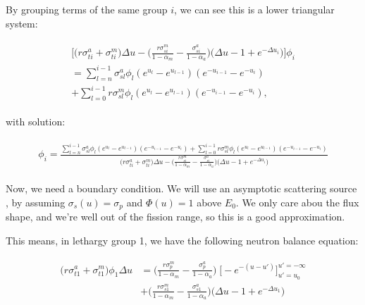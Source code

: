 \documentclass{article}
\begin{document}
        By grouping terms of the same group $i$, we can see this is a lower triangular system:

        \begin{align}
        \begin{split}
            \label{eq:ltri}
            \bigg[ 
                \bigg( r \sigma_{ti}^a + \sigma_{ti}^m  \bigg) \Delta u  - 
                \bigg( \frac{r \sigma_{si}^m }{1-\alpha_m} - \frac{\sigma_{si}^a }{1-\alpha_a}  \bigg)
                \bigg( \Delta u -1 + e^{-\Delta u_i} \bigg) 
            \bigg] \phi_i \\ =
              \sum_{l = n}^{i-1} \sigma_{sl}^a \phi_l  (e^{u_l} - e^{u_{l-1}})   (e^{-u_{i-1}} - e^{-u_{i}}) \\ 
            + \sum_{l = 0}^{i-1} r \sigma_{sl}^m \phi_l  (e^{u_l} - e^{u_{l-1}}) (e^{-u_{i-1}} - e^{-u_{i}}),
        \end{split}
        \end{align}

        with solution:
        
        \begin{align}
        \begin{split}
            \label{eq:soln}
            \phi_i =
            \frac{
                \sum_{l = n}^{i-1} \sigma_{sl}^a \phi_l  (e^{u_l} - e^{u_{l-1}})   (e^{-u_{i-1}} - e^{-u_{i}}) 
                + \sum_{l = 0}^{i-1} r \sigma_{sl}^m \phi_l  (e^{u_l} - e^{u_{l-1}}) (e^{-u_{i-1}} - e^{-u_{i}})
            }
            {  
                \bigg( r \sigma_{ti}^a + \sigma_{ti}^m  \bigg) \Delta u  - 
                \bigg( \frac{r \sigma_{si}^m }{1-\alpha_m} - \frac{\sigma_{si}^a }{1-\alpha_a}  \bigg)
                \bigg( \Delta u -1 + e^{-\Delta u_i} \bigg) 
             }
        \end{split}
        \end{align}

        Now, we need a boundary condition. 
        We will use an asymptotic scattering source , by assuming $\sigma_s(u) = \sigma_p$ and 
        $\Phi(u) = 1$ above $E_0$. 
        We only care abou the flux shape, and we're well out of the fission range, so this is a good approximation.
        
        This means, in lethargy group 1, we have the following neutron balance equation:
        
        \begin{align}
        \begin{split}
            \label{eq:balance_group-1}
            \big( r \sigma_{t1}^a + \sigma_{t1}^m  \big) \phi_1 \Delta u &=
            \bigg( \frac{r \sigma_{p}^m }{1-\alpha_m} - \frac{\sigma_{p}^a }{1-\alpha_a} \bigg)
            \; \bigg[ -e^{-(u-u')} \bigg]_{u' = u_0}^{u'= - \infty}
               \\ &+ 
            \bigg( \frac{r \sigma_{s1}^m }{1-\alpha_m} - \frac{\sigma_{s1}^a }{1-\alpha_a}  \bigg)
            \bigg( \Delta u -1 + e^{-\Delta u_1} \bigg) 
        \end{split}
        \end{align}
        
\end{document}

